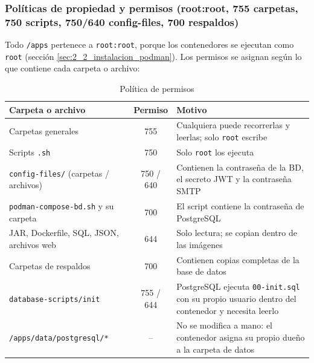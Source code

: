 \subsubsection{Políticas de propiedad y permisos (root:root, 755 carpetas, 750 scripts, 750/640 config-files, 700 respaldos)}
Todo \texttt{/apps} pertenece a \texttt{root:root}, porque los contenedores se ejecutan como \texttt{root} (sección \ref{sec:2_2_instalacion_podman}). Los permisos se asignan según lo que contiene cada carpeta o archivo:

\begin{table}[H]
\centering
\caption{Política de permisos}
\small
\begin{tabular}{p{5.4cm}cp{7.2cm}}
\toprule
\textbf{Carpeta o archivo} & \textbf{Permiso} & \textbf{Motivo} \\
\midrule
Carpetas generales & 755 & Cualquiera puede recorrerlas y leerlas; solo \texttt{root} escribe \\
Scripts \texttt{.sh} & 750 & Solo \texttt{root} los ejecuta \\
\texttt{config-files/} (carpetas / archivos) & 750 / 640 & Contienen la contraseña de la BD, el secreto JWT y la contraseña SMTP \\
\texttt{podman-compose-bd.sh} y su carpeta & 700 & El script contiene la contraseña de PostgreSQL \\
JAR, Dockerfile, SQL, JSON, archivos web & 644 & Solo lectura; se copian dentro de las imágenes \\
Carpetas de respaldos & 700 & Contienen copias completas de la base de datos \\
\texttt{database-scripts/init} & 755 / 644 & PostgreSQL ejecuta \texttt{00-init.sql} con su propio usuario dentro del contenedor y necesita leerlo \\
\nolinkurl{/apps/data/postgresql/*} & -- & No se modifica a mano: el contenedor asigna su propio dueño a la carpeta de datos \\
\bottomrule
\end{tabular}
\end{table}

